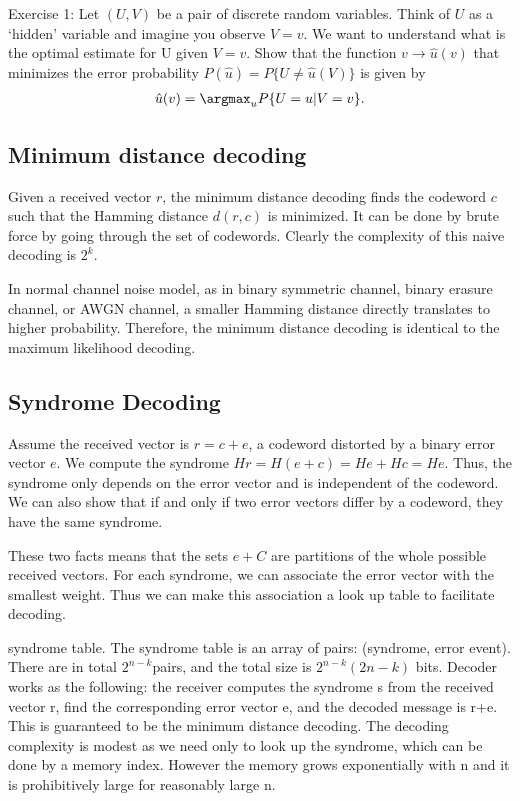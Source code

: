 Exercise 1: Let \((U, V )\) be a pair of discrete random variables. Think of \(U\) as a ‘hidden’ variable and imagine you observe \(V = v\). We want to understand what is the optimal estimate for U given \(V = v\). Show that the function \(v \rightarrow \hat{u}(v)\) that minimizes the error probability \(P(\hat{u}) = P \{U \neq \hat{u}(V )\}\) is given by
\begin{align*}
    \hat{u}(v) = \argmax_u P\{U=u|V=v\}.
\end{align*}

\subsection{Minimum distance decoding}
Given a received vector \(r\), the minimum distance decoding finds the codeword \(c\) such that the Hamming distance \(d(r, c)\) is minimized. It can be done by brute force by going through the set of codewords. Clearly the complexity of this naive decoding is \(2^k\).

In normal channel noise model, as in binary symmetric channel, binary erasure channel, or AWGN channel, a smaller Hamming distance directly translates to higher probability. Therefore, the minimum distance decoding is identical to the maximum likelihood decoding.

\subsection{Syndrome Decoding}
Assume the received vector is \(r = c + e\), a codeword distorted by a binary error vector \(e\). We compute the syndrome \(Hr = H(e+c) = He + Hc = He\). Thus, the syndrome only depends on the error vector and is independent of the codeword.
We can also show that if and only if two error vectors differ by a codeword, they have the same syndrome.

These two facts means that the sets \(e + C\) are partitions of the whole possible received vectors. For each syndrome, we can associate the error vector with the smallest weight. Thus we can make this association a look up table to facilitate decoding.

syndrome table. The syndrome table is an array of pairs: (syndrome, error event). There are in total \(2^{n-k}\)pairs, and the total size is \(2^{n-k}(2n-k)\) bits.
Decoder works as the following: the receiver computes the syndrome s from the received vector r, find the corresponding error vector e, and the decoded message is r+e. This is guaranteed to be the minimum distance decoding.
The decoding complexity is modest as we need only to look up the syndrome, which can be done by a memory index. However the memory grows exponentially with n and it is prohibitively large for reasonably large n.

